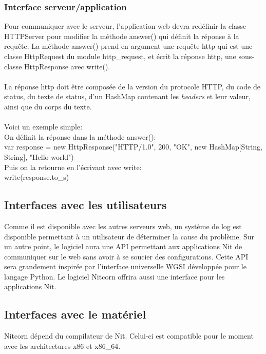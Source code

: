 \documentclass{scrreprt}
\begin{document}
\subsubsection{Interface serveur/application}
Pour communiquer avec le serveur, l'application web devra redéfinir la classe HTTPServer pour modifier la méthode answer() qui définit la réponse à la requête. 
La méthode answer() prend en argument une requête http qui est une classe HttpRequest du module http_request, et écrit la réponse http, une sous-classe HttpResponse avec write().\\\\
La réponse http doit être composée de la version du protocole HTTP, du code de status, du texte de status, d'un HashMap contenant les \textit{headers} et leur valeur, ainsi que du corps du texte.\\\\
Voici un exemple simple:\\
On définit la réponse dans la méthode answer():\\
var response = new HttpResponse("HTTP/1.0", 200, "OK", new HashMap[String, String], "Hello world")\\
Puis on la retourne en l'écrivant avec write:\\
write(response.to_s)


\subsection{Interfaces avec les utilisateurs}
Comme il est disponible avec les autres serveurs web, un système de log est
disponible permettant à un utilisateur de déterminer la cause du problème. Sur
un autre point, le logiciel aura une API permettant aux applications Nit de
communiquer sur le web sans avoir à se soucier des configurations. Cette
API sera grandement inspirée par l'interface universelle WGSI développée pour
le langage Python. Le logiciel Nitcorn offrira aussi une interface pour les
applications Nit.

\subsection{Interfaces avec le matériel}
Nitcorn dépend du compilateur de Nit. Celui-ci est compatible pour le moment avec
les architectures x86 et x86_64.
\end{document}
